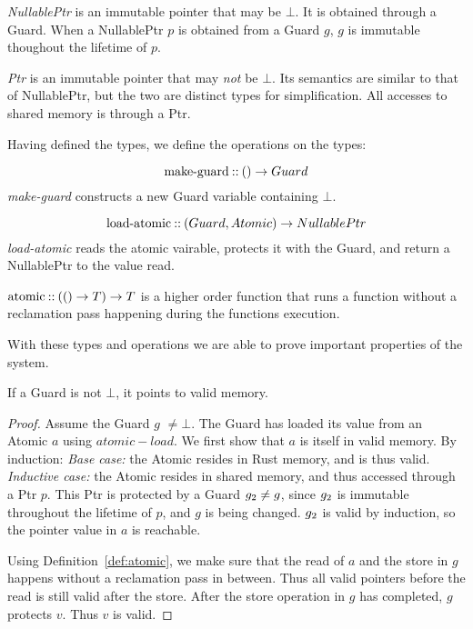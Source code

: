 \begin{definition}[NullablePtr]
  \emph{NullablePtr} is an immutable pointer that may be $\bot$. It is obtained through a Guard.
  When a NullablePtr $p$ is obtained from a Guard $g$, $g$ is immutable thoughout the lifetime of
  $p$.
\end{definition}

\begin{definition}[Ptr]
  \emph{Ptr} is an immutable pointer that may \emph{not} be $\bot$. Its semantics are similar to
  that of NullablePtr, but the two are distinct types for simplification. All accesses to shared
  memory is through a Ptr.
\end{definition}


Having defined the types, we define the operations on the types:

\begin{definition}
\begin{equation}\label{eq:make-guard}
  \text{make-guard\:::\:} () \to Guard
\end{equation}
\emph{make-guard} constructs a new Guard variable containing $\bot$.

\begin{equation}\label{eq:load-atomic}
  \text{load-atomic\:::\:} (Guard, Atomic) \to NullablePtr
\end{equation}
\emph{load-atomic} reads the atomic vairable, protects it with the Guard, and return a NullablePtr
to the value read.
\end{definition}

\begin{definition}\label{def:atomic}
  $\text{atomic\:::\:} (() \to T) \to T$ is a higher order function that runs a function without
  a reclamation pass happening during the functions execution.
\end{definition}




With these types and operations we are able to prove important properties of the system.

\begin{theorem}\label{thm:guard-valid}
  If a Guard is not $\bot$, it points to valid memory.
\end{theorem}
\begin{proof}
  Assume the Guard $g$ $\neq \bot$.
  The Guard has loaded its value from an Atomic $a$ using $atomic-load$.
We first show that $a$ is itself in valid memory. By induction:
\emph{Base case:} the Atomic resides in Rust memory, and is thus valid. \emph{Inductive case:} the
Atomic resides in shared memory, and thus accessed through a Ptr $p$.  This Ptr is protected by a
Guard $g\sb{2} \neq g$, since $g\sb{2}$ is immutable throughout the lifetime of $p$, and $g$ is
being changed. $g\sb{2}$ is valid by induction, so the pointer value in $a$ is reachable.

Using Definition~\ref{def:atomic}, we make sure that the read of $a$ and the store in $g$ happens
without a reclamation pass in between. Thus all valid pointers before the read is still valid after
the store.  After the store operation in $g$ has completed, $g$ protects $v$. Thus $v$ is valid.
\end{proof}

